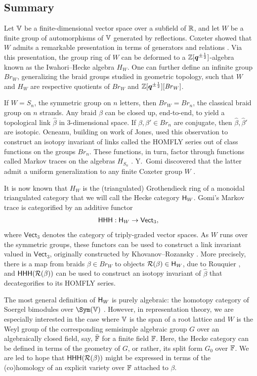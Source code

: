 \documentclass[a4paper,10pt,leqno]{amsart}
\theoremstyle{plain}
\theoremstyle{plain}
\theoremstyle{plain}
\theoremstyle{definition}
\theoremstyle{remark}
\newcommand{\Br}{\mathit{Br}}
\newcommand{\Q}{\bm{q}}
\newcommand{\Vect}{\mathsf{Vect}}
\begin{document}
\subsection{Summary}

Let $\bb{V}$ be a finite-dimensional vector space over a subfield of $\bb{R}$, and let $W$ be a finite group of automorphisms of $\bb{V}$ generated by reflections.
Coxeter showed that $W$ admits a remarkable presentation in terms of generators and relations \cite{coxeter_1934}.
Via this presentation, the group ring of $W$ can be deformed to a $\bb{Z}[\Q^{\pm\frac{1}{2}}]$-algebra known as the Iwahori--Hecke algebra $H_W$.
One can further define an infinite group $\Br_W$, generalizing the braid groups studied in geometric topology, such that $W$ and $H_W$ are respective quotients of $\Br_W$ and $\bb{Z}[\Q^{\pm\frac{1}{2}}][\Br_W]$.

If $W = S_n$, the symmetric group on $n$ letters, then $\Br_W = \Br_n$, the classical braid group on $n$ strands.
Any braid $\beta$ can be closed up, end-to-end, to yield a topological link $\hat{\beta}$ in $3$-dimensional space.
If $\beta, \beta' \in \Br_n$ are conjugate, then $\hat{\beta}, \hat{\beta}'$ are isotopic.
Ocneanu, building on work of Jones, used this observation to construct an isotopy invariant of links called the HOMFLY series out of class functions on the groups $\Br_n$.
These functions, in turn, factor through functions called Markov traces on the algebras $H_{S_n}$ \cite{homfly, jones}.
Y.\ Gomi discovered that the latter admit a uniform generalization to any finite Coxeter group $W$ \cite{gomi}.

It is now known that $H_W$ is the (triangulated) Grothendieck ring of a monoidal triangulated category that we will call the Hecke category $\sf{H}_W$.
Gomi's Markov trace is categorified by an additive functor
\begin{align}
\sf{HHH} : \sf{H}_W \to \Vect_3,
\end{align}
where $\Vect_3$ denotes the category of triply-graded vector spaces.
As $W$ runs over the symmetric groups, these functors can be used to construct a link invariant valued in $\Vect_3$, originally constructed by Khovanov--Rozansky \cite{kr, 
khovanov}.
More precisely, there is a map from braids $\beta \in \Br_W$ to objects $\cal{R}(\beta) \in \sf{H}_W$, due to Rouquier \cite{rouquier_2006}, and $\sf{HHH}(\cal{R}(\beta))$ can be used to construct an isotopy invariant of $\hat{\beta}$ that decategorifies to its HOMFLY series.

The most general definition of $\sf{H}_W$ is purely algebraic: the homotopy category of Soergel bimodules over $\Sym(\bb{V})$ \cite{ew_2014, ew_2016}.
However, in representation theory, we are especially interested in the case where $\bb{V}$ is the span of a root lattice and $W$ is the Weyl group of the corresponding semisimple algebraic group $G$ over an algebraically closed field, say, $\bar{\bb{F}}$ for a finite field $\bb{F}$.
Here, the Hecke category can be defined in terms of the geometry of $G$, or rather, its split form $G_0$ over $\bb{F}$.
We are led to hope that $\sf{HHH}(\cal{R}(\beta))$ might be expressed in terms of the (co)homology of an explicit variety over $\bb{F}$ attached to $\beta$.
\end{document}

